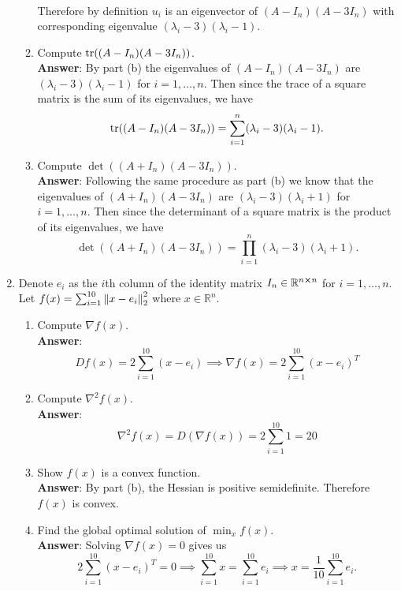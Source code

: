 \documentclass{article}
\begin{document}
\begin{enumerate}
\begin{enumerate}
\begin{align*}
                    \end{align*}
                    Therefore by definition $u_i$ is an eigenvector of $(A-I_n)(A-3I_n)$ with corresponding eigenvalue $(\lambda_i-3)(\lambda_i-1)$.
              \item Compute $\tr((A-I_n)(A-3I_n))$.\\
                    \textbf{Answer}: By part (b) the eigenvalues of $(A-I_n)(A-3I_n)$ are $(\lambda_i-3)(\lambda_i-1)$ for $i=1,\ldots,n$. Then since the trace of a square matrix is the sum of its eigenvalues, we have \[\tr((A-I_n)(A-3I_n))=\sum_{i=1}^n(\lambda_i-3)(\lambda_i-1).\]
              \item Compute $\det((A+I_n)(A-3I_n))$.\\
                    \textbf{Answer}: Following the same procedure as part (b) we know that the eigenvalues of $(A+I_n)(A-3I_n)$ are $(\lambda_i-3)(\lambda_i+1)$ for $i=1,\ldots,n$. Then since the determinant of a square matrix is the product of its eigenvalues, we have \[\det((A+I_n)(A-3I_n))=\prod_{i=1}^n(\lambda_i-3)(\lambda_i+1).\]
          \end{enumerate}
          \newpage
    \item Denote $e_i$ as the $i$th column of the identity matrix $I_n\in\mathbb{R}^{n\cross n}$ for $i=1,\ldots,n$. Let $f(x)=\sum_{i=1}^{10}\norm{x-e_i}_2^2$ where $x\in\mathbb{R}^n$.
          \begin{enumerate}
              \item Compute $\nabla f(x)$.\\
                    \textbf{Answer}: \[
                        Df(x)=2\sum_{i=1}^{10}(x-e_i)\implies\nabla f(x)=2\sum_{i=1}^{10}(x-e_i)^T
                    \]
              \item Compute $\nabla^2 f(x)$.\\
                    \textbf{Answer}: \[
                        \nabla^2 f(x)=D(\nabla f(x))=2\sum_{i=1}^{10}1=20
                    \]
              \item Show $f(x)$ is a convex function.\\
                    \textbf{Answer}: By part (b), the Hessian is positive semidefinite. Therefore $f(x)$ is convex.
              \item Find the global optimal solution of $\min_xf(x)$.\\
                    \textbf{Answer}: Solving $\nabla f(x)=0$ gives us \[
                        2\sum_{i=1}^{10}(x-e_i)^T=0\implies\sum_{i=1}^{10}x=\sum_{i=1}^{10}e_i\implies x=\frac{1}{10}\sum_{i=1}^{10}e_i.
\]
\end{enumerate}
\end{enumerate}
\end{document}
